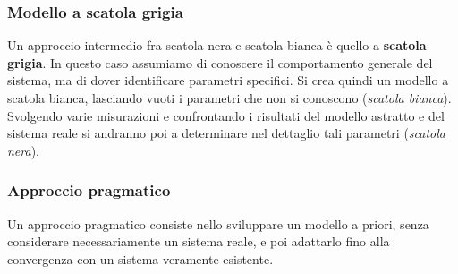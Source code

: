 \documentclass[a4paper,11pt]{article}
\begin{document}
\subsubsection{Modello a scatola grigia}
Un approccio intermedio fra scatola nera e scatola bianca è quello a \textbf{scatola grigia}.
In questo caso assumiamo di conoscere il comportamento generale del sistema, ma di dover identificare parametri specifici.
Si crea quindi un modello a scatola bianca, lasciando vuoti i parametri che non si conoscono (\textit{scatola bianca}). 
Svolgendo varie misurazioni e confrontando i risultati del modello astratto e del sistema reale si andranno poi a determinare nel dettaglio tali parametri (\textit{scatola nera}).

\subsubsection{Approccio pragmatico}
Un approccio pragmatico consiste nello sviluppare un modello a priori, senza considerare necessariamente un sistema reale, e poi adattarlo fino alla convergenza con un sistema veramente esistente.
\end{document}

